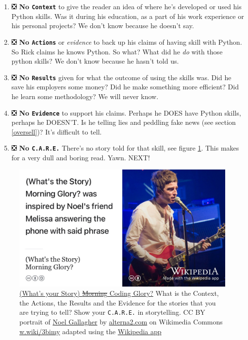 \documentclass[
]{book}
\providecommand{\tightlist}{%
  \setlength{\itemsep}{0pt}\setlength{\parskip}{0pt}}
\begin{document}
\begin{enumerate}
\def\labelenumi{\arabic{enumi}.}
\tightlist
\item
  ❎ \textbf{No \texttt{Context}} to give the reader an idea of where he's developed or used his Python skills. Was it during his education, as a part of his work experience or his personal projects? We don't know because he doesn't say.\\
\item
  ❎ \textbf{No \texttt{Actions}} or \emph{evidence} to back up his claims of having skill with Python. So Rick claims he knows Python. So what? What did he \emph{do} with those python skills? We don't know because he hasn't told us.
\item
  ❎ \textbf{No \texttt{Results}} given for what the outcome of using the skills was. Did he save his employers some money? Did he make something more efficient? Did he learn some methodology? We will never know.\\
\item
  ❎ \textbf{No \texttt{Evidence}} to support his claims. Perhaps he DOES have Python skills, perhaps he DOESN'T. Is he telling lies and peddling fake news (see section \ref{oversell})? It's difficult to tell.
\item
  ❎ \textbf{No \texttt{C.A.R.E.}} There's no story told for that skill, see figure \ref{fig:gallagher-fig}. This makes for a very dull and boring read. Yawn. NEXT! 🥱
\end{enumerate}

\begin{figure}

{\centering \includegraphics[width=1\linewidth]{images/whats-the-story} 

}

\caption{\href{https://en.wikipedia.org/wiki/(What\%27s_the_Story)_Morning_Glory\%3F}{(What's your Story) \sout{Morning} Coding Glory?} What is the Context, the Actions, the Results and the Evidence for the stories that you are trying to tell? Show your \texttt{C.A.R.E.} in storytelling. CC BY portrait of \href{https://en.wikipedia.org/wiki/Noel_Gallagher}{Noel Gallagher} by \href{https://alterna2.com/}{alterna2.com} on Wikimedia Commons \href{https://w.wiki/3bim}{w.wiki/3bimy} adapted using the \href{https://apps.apple.com/us/app/wikipedia/id324715238}{Wikipedia app}}\label{fig:gallagher-fig}
\end{figure}
\end{document}
